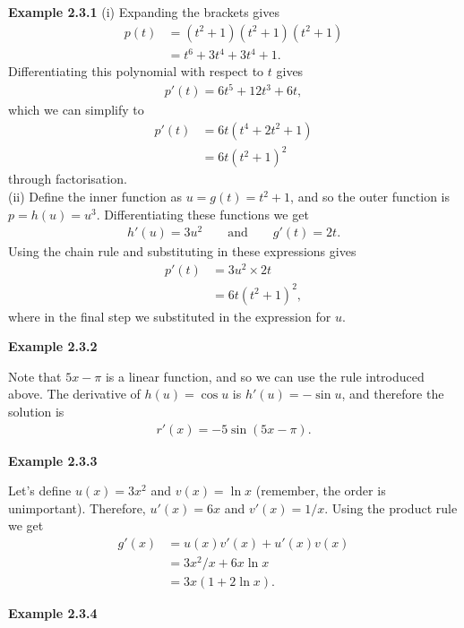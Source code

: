\vspace{10mm}
\textbf{Example 2.3.1}
(i) Expanding the brackets gives 
\begin{align*}
    p(t) &= (t^2+1)(t^2+1)(t^2+1)\\
    &= t^6+3t^4+3t^4+1.
\end{align*} 
Differentiating this polynomial with respect to $t$ gives 
\begin{align*}
    p'(t) = 6t^5 + 12t^3 + 6t,
\end{align*}
which we can simplify to
\begin{align*}
p'(t) &= 6t(t^4+2t^2+1)\\
&=6t(t^2+1)^2
\end{align*}
through factorisation.\\

(ii) Define the inner function as $u=g(t)=t^2+1$, and so the outer function is $p=h(u)=u^3$. Differentiating these functions we get 
\begin{align*}
    h'(u)=3u^2 \qquad \mathrm{and} \qquad g'(t)=2t.
\end{align*} 
Using the chain rule and substituting in these expressions gives
\begin{align*}
    p'(t) &= 3u^2 \times 2t \\
    &= 6t(t^2+1)^2,
\end{align*}
where in the final step we substituted in the expression for $u$.


\vspace{10mm}
\textbf{Example 2.3.2}

Note that $5x-\pi$ is a linear function, and so we can use the rule introduced above. The derivative of $h(u) = \cos u$ is $h'(u) = -\sin u$, and therefore the solution is
\begin{align*}
    r'(x) = -5\sin(5x-\pi).
\end{align*}

\vspace{10mm}
\textbf{Example 2.3.3}

Let's define $u(x) = 3x^2$ and $v(x) = \ln x$ (remember, the order is unimportant). Therefore, $u'(x) = 6x$ and $v'(x) = 1/x$. Using the product rule we get
\begin{align*}
    g'(x) &= u(x)v'(x)+u'(x)v(x) \\
    &= 3x^2 / x + 6x \ln x \\
    &= 3x (1 + 2\ln x).
\end{align*}

\vspace{10mm}
\textbf{Example 2.3.4}

